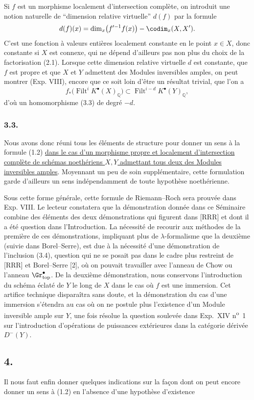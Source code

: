 Si $f$ est un
morphisme localement d'intersection compl\`ete, on introduit une notion naturelle de ``dimension relative virtuelle'' $d(f)$ par la formule
\[
d(f)(x)=\dim_x\bigl(f'^{-1}f(x)\bigr)-\codim_x(X,X').
\]
C'est une fonction \`a valeurs enti\`eres localement constante en le point $x\in X$, donc constante si $X$ est connexe, qui ne d\'epend d'ailleurs pas non plus du choix de la factorisation (2.1). Lorsque cette dimension relative virtuelle $d$ est constante, que $f$ est propre et que $X$ et $Y$ admettent des Modules inversibles amples, on peut montrer (Exp. VIII), encore que ce soit loin d'\^etre un r\'esultat trivial, que l'on a
\begin{equation}\tag{3.4}
f_*\bigl(\operatorname{Filt}^iK^\bullet(X)_{\mathbb Q}\bigr)\subset \operatorname{Filt}^{i-d}K^\bullet(Y)_{\mathbb Q},
\end{equation}
d'o\`u un homomorphisme (3.3) de degr\'e $-d$.

\subsubsection*{3.3.}
Nous avons donc r\'euni tous les \'el\'ements de structure pour donner un sens \`a la formule (1.2) \uline{dans le cas d'un morphisme propre et localement d'intersection compl\`ete de sch\'emas noeth\'eriens $X,Y$ admettant tous deux des Modules inversibles amples}. Moyennant un peu de soin suppl\'ementaire, cette formulation garde d'ailleurs un sens ind\'ependamment de toute hypoth\`ese noeth\'erienne.

Sous cette forme g\'en\'erale, cette formule de Riemann--Roch sera prouv\'ee dans Exp. VIII. Le lecteur constatera que la d\'emonstration donn\'ee dans ce S\'eminaire combine des \'el\'ements des deux d\'emonstrations qui figurent dans [RRR] et dont il a \'et\'e question dans l'Introduction. La n\'ecessit\'e de recourir aux m\'ethodes de la premi\`ere de ces d\'emonstrations, impliquant plus de $\lambda$-formalisme que la deuxi\`eme (suivie dans Borel--Serre), est due \`a la n\'ecessit\'e d'une d\'emonstration de l'inclusion (3.4), question qui ne se posait pas dans le cadre plus restreint de [RRR] et Borel--Serre [2], o\`u on pouvait travailler avec l'anneau de Chow ou l'anneau $\Gr^\bullet_{\mathrm{top}}$. De la deuxi\`eme d\'emonstration, nous conservons l'introduction du sch\'ema \'eclat\'e de $Y$ le long de $X$ dans le cas o\`u $f$ est une immersion. Cet artifice technique dispara\^itra sans doute, et la d\'emonstration du cas d'une immersion s'\'etendra au cas o\`u on ne postule plus l'existence d'un Module inversible ample sur $Y$, une fois r\'esolue la question soulev\'ee dans Exp.\ XIV n\textsuperscript{o}~1 sur l'introduction d'op\'erations de puissances ext\'erieures dans la cat\'egorie d\'eriv\'ee $D^-(Y)$.

\subsection*{4.}
Il nous faut enfin donner quelques indications sur la fa\c{c}on dont on peut encore donner un sens \`a (1.2) en l'absence d'une hypoth\`ese d'existence 
